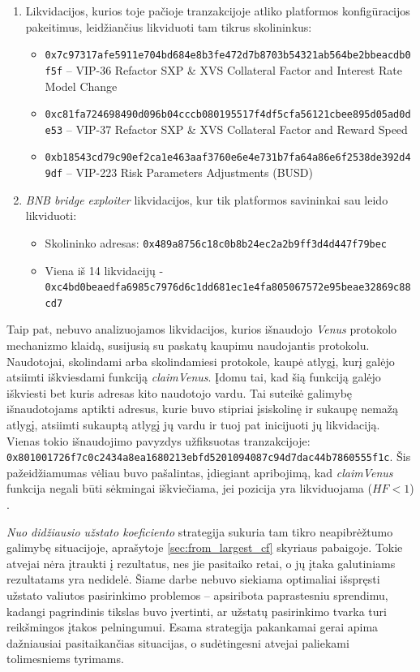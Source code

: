 \documentclass[]{VUMIFTemplateClass}
\begin{document}
\begin{enumerate}
    \item Likvidacijos, kurios toje pačioje tranzakcijoje atliko platformos konfigūracijos pakeitimus, leidžiančius likviduoti tam tikrus skolininkus:
    \begin{itemize}
        \item \texttt{0x7c97317afe5911e704bd684e8b3fe472d7b8703b54321ab564be2bbeacdb0f5f} – VIP-36 Refactor SXP \& XVS Collateral Factor and Interest Rate Model Change
        \item \texttt{0xc81fa724698490d096b04cccb080195517f4df5cfa56121cbee895d05ad0de53} – VIP-37 Refactor SXP \& XVS Collateral Factor and Reward Speed
        \item \texttt{0xb18543cd79c90ef2ca1e463aaf3760e6e4e731b7fa64a86e6f2538de392d49df} – VIP-223 Risk Parameters Adjustments (BUSD)
    \end{itemize}
    \item \textit{BNB bridge exploiter} likvidacijos, kur tik platformos savininkai sau leido likviduoti:
    \begin{itemize}
        \item Skolininko adresas: \texttt{0x489a8756c18c0b8b24ec2a2b9ff3d4d447f79bec}
        \item Viena iš 14 likvidacijų - \\\texttt{0xc4bd0beaedfa6985c7976d6c1dd681ec1e4fa805067572e95beae32869c88cd7}
    \end{itemize}
\end{enumerate}

Taip pat, nebuvo analizuojamos likvidacijos, kurios išnaudojo \textit{Venus} protokolo mechanizmo klaidą, susijusią su paskatų kaupimu naudojantis protokolu. Naudotojai, skolindami arba skolindamiesi protokole, kaupė atlygį, kurį galėjo atsiimti iškviesdami funkciją \textit{claimVenus}. Įdomu tai, kad šią funkciją galėjo iškviesti bet kuris adresas kito naudotojo vardu. Tai suteikė galimybę išnaudotojams aptikti adresus, kurie buvo stipriai įsiskolinę ir sukaupę nemažą atlygį, atsiimti sukauptą atlygį jų vardu ir tuoj pat inicijuoti jų likvidaciją. Vienas tokio išnaudojimo pavyzdys užfiksuotas tranzakcijoje: \texttt{0x801001726f7c0c2434a8ea1680213ebfd5201094087c94d7dac44b7860555f1c}. Šis pažeidžiamumas vėliau buvo pašalintas, įdiegiant apribojimą, kad \textit{claimVenus} funkcija negali būti sėkmingai iškviečiama, jei pozicija yra likviduojama ($HF < 1$) \cite{exploitFix}.


\textit{Nuo didžiausio užstato koeficiento} strategija sukuria tam tikro neapibrėžtumo galimybę situacijoje, aprašytoje \ref{sec:from_largest_cf} skyriaus pabaigoje. Tokie atvejai nėra įtraukti į rezultatus, nes jie pasitaiko retai, o jų įtaka galutiniams rezultatams yra nedidelė. Šiame darbe nebuvo siekiama optimaliai išspręsti užstato valiutos pasirinkimo problemos – apsiribota paprastesniu sprendimu, kadangi pagrindinis tikslas buvo įvertinti, ar užstatų pasirinkimo tvarka turi reikšmingos įtakos pelningumui. Esama strategija pakankamai gerai apima dažniausiai pasitaikančias situacijas, o sudėtingesni atvejai paliekami tolimesniems tyrimams.
\end{document}
